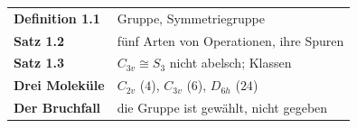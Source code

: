 \begin{merksatz}
\begin{center}
\renewcommand{\arraystretch}{1.5}
\begin{tabular}{@{}P{3.0cm}P{5.6cm}@{}}
\toprule
\textbf{Definition 1.1} & Gruppe, Symmetriegruppe\\
\textbf{Satz 1.2} & fünf Arten von Operationen, ihre Spuren\\
\textbf{Satz 1.3} & $C_{3v}\cong S_3$ nicht abelsch; Klassen\\
\textbf{Drei Moleküle} & $C_{2v}$ ($4$), $C_{3v}$ ($6$), $D_{6h}$ ($24$)\\
\textbf{Der Bruchfall} & die Gruppe ist gewählt, nicht gegeben\\
\bottomrule
\end{tabular}
\end{center}

\begin{center}
\begin{minipage}{0.88\textwidth}
\end{minipage}
\end{center}
\end{merksatz}
